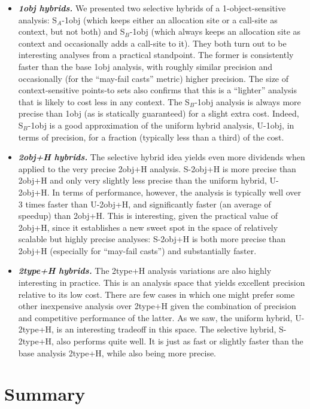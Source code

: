 \begin{itemize}
\item \textbf{\emph{1obj hybrids.}}
We presented two selective hybrids of a 1-object-sensitive analysis: S$_A$-1obj (which keeps either an allocation site or a call-site as context, but not both) and S$_B$-1obj (which always keeps an allocation site as context and occasionally adds a call-site to it). They both turn out to be interesting analyses from a practical standpoint. The former is consistently faster than the base 1obj analysis, with roughly similar precision and occasionally (for the ``may-fail casts'' metric) higher precision. The size of context-sensitive points-to sets also confirms that this is a ``lighter'' analysis that is likely to cost less in any context. The S$_B$-1obj analysis is always more precise than 1obj (as is statically guaranteed) for a slight extra cost. Indeed, S$_B$-1obj is a good approximation of the uniform hybrid analysis, U-1obj, in terms of precision, for a fraction (typically less than a third) of the cost.

\item \textbf{\emph{2obj+H hybrids.}}
The selective hybrid idea yields even more dividends when applied to the very precise 2obj+H analysis. S-2obj+H is more precise than 2obj+H and only very slightly less precise than the uniform hybrid, U-2obj+H. In terms of performance, however, the analysis is typically well over 3 times faster than U-2obj+H, and significantly faster (an average of  speedup) than 2obj+H. This is interesting, given the practical value of 2obj+H, since it establishes a new sweet spot in the space of relatively scalable but highly precise analyses: S-2obj+H is both more precise than 2obj+H (especially for ``may-fail casts'') and substantially faster.

\item \textbf{\emph{2type+H hybrids.}}
The 2type+H analysis variations are also highly interesting in practice. This is an analysis space that yields excellent precision relative to its low cost. There are few cases in which one might prefer some other inexpensive analysis over 2type+H given the combination of precision and competitive performance of the latter. As we saw, the uniform hybrid, U-2type+H, is an interesting tradeoff in this space. The selective hybrid, S-2type+H, also performs quite well. It is just as fast or slightly faster than the base analysis 2type+H, while also being more precise.
\end{itemize}


\section{Summary}

